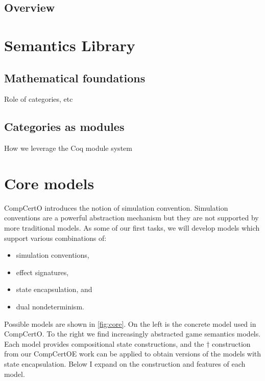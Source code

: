 \documentclass{article}
\begin{document}
\subsection{Overview}

\newpage


\section{Semantics Library} %

\subsection{Mathematical foundations}

Role of categories, etc

\subsection{Categories as modules}

How we leverage the Coq module system


\newpage

\section{Core models} %

CompCertO introduces the notion of simulation convention.
Simulation conventions are a powerful abstraction mechanism
but they are not supported by more traditional models.
As some of our first tasks,
we will develop models which support various combinations of:
\begin{itemize}
  \item simulation conventions,
  \item effect signatures,
  \item state encapsulation, and
  \item dual nondeterminism.
\end{itemize}

Possible models are shown in \autoref{fig:core}.
On the left is the concrete model used in CompCertO.
To the right we find increasingly abstracted game semantics models.
Each model provides compositional state constructions, and
the $\dagger$ construction from our CompCertOE work
can be applied to obtain versions of the models with
state encapsulation.
Below I expand on the construction and features of each model.
\end{document}

